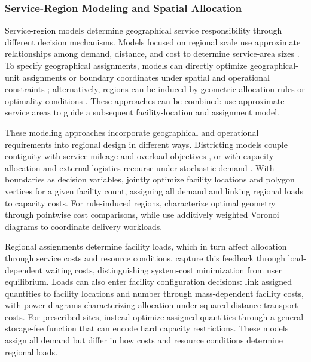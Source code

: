 \documentclass[a4paper,fleqn]{cas-sc}
\theoremstyle{remark}
\theoremstyle{plain}
\begin{document}
\subsubsection{Service-Region Modeling and Spatial Allocation}\label{subsec:lit_regions}

Service-region models determine geographical service responsibility through different decision mechanisms. Models focused on regional scale use approximate relationships among demand, distance, and cost to determine service-area sizes \citep{ansari2018advancements}. To specify geographical assignments, models can directly optimize geographical-unit assignments or boundary coordinates under spatial and operational constraints \citep{erlebacher2000interaction,kalcsics2019districting,murat2010continuous}; alternatively, regions can be induced by geometric allocation rules or optimality conditions \citep{novaes2009continuous,mallozzi2018geometry}. These approaches can be combined: \citet{mizutani2025spare} use approximate service areas to guide a subsequent facility-location and assignment model.

These modeling approaches incorporate geographical and operational requirements into regional design in different ways. Districting models couple contiguity with service-mileage and overload objectives \citep{han2020districting}, or with capacity allocation and external-logistics recourse under stochastic demand \citep{bruni2026districting}. With boundaries as decision variables, \citet{murat2010continuous} jointly optimize facility locations and polygon vertices for a given facility count, assigning all demand and linking regional loads to capacity costs. For rule-induced regions, \citet{mallozzi2018geometry} characterize optimal geometry through pointwise cost comparisons, while \citet{carlsson2026equitable} use additively weighted Voronoi diagrams to coordinate delivery workloads.

Regional assignments determine facility loads, which in turn affect allocation through service costs and resource conditions. \citet{crippa2009queue} capture this feedback through load-dependent waiting costs, distinguishing system-cost minimization from user equilibrium. Loads can also enter facility configuration decisions: \citet{bourne2015centroidal} link assigned quantities to facility locations and number through mass-dependent facility costs, with power diagrams characterizing allocation under squared-distance transport costs. For prescribed sites, \citet{bansil2023storage} instead optimize assigned quantities through a general storage-fee function that can encode hard capacity restrictions. These models assign all demand but differ in how costs and resource conditions determine regional loads.
\end{document}
